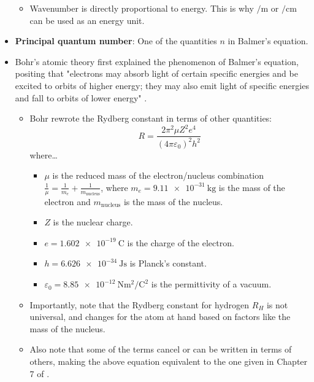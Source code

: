 \documentclass[../notes.tex]{subfiles}
\begin{document}
\begin{itemize}
    \begin{itemize}
        \item Wavenumber is directly proportional to energy. This is why $\si{\per\meter}$ or $\si{\per\centi\meter}$ can be used as an energy unit.
    \end{itemize}
    \item \textbf{Principal quantum number}: One of the quantities $n$ in Balmer's equation.
    \item Bohr's atomic theory first explained the phenomenon of Balmer's equation, positing that "electrons may absorb light of certain specific energies and be excited to orbits of higher energy; they may also emit light of specific energies and fall to orbits of lower energy" \parencite[11-12]{bib:MiesslerFischerTarr}.
    \begin{itemize}
        \item Bohr rewrote the Rydberg constant in terms of other quantities:
        \begin{equation*}
            R = \frac{2\pi^2\mu Z^2e^4}{(4\pi\varepsilon_0)^2h^2}
        \end{equation*}
        where\dots
        \begin{itemize}
            \item $\mu$ is the reduced mass of the electron/nucleus combination $\frac{1}{\mu}=\frac{1}{m_e}+\frac{1}{m_\text{nucleus}}$, where $m_e=\SI{9.11e-31}{\kilo\gram}$ is the mass of the electron and $m_\text{nucleus}$ is the mass of the nucleus.
            \item $Z$ is the nuclear charge.
            \item $e=\SI{1.602e-19}{\coulomb}$ is the charge of the electron.
            \item $h=\SI{6.626e-34}{\joule\second}$ is Planck's constant.
            \item $\varepsilon_0=\SI{8.85e-12}{\newton\meter\squared\per\coulomb\squared}$ is the permittivity of a vacuum.
        \end{itemize}
        \item Importantly, note that the Rydberg constant for hydrogen $R_H$ is not universal, and changes for the atom at hand based on factors like the mass of the nucleus.
        \item Also note that some of the terms cancel or can be written in terms of others, making the above equation equivalent to the one given in Chapter 7 of \textcite{bib:APChemNotes}.
    \end{itemize}
    \begin{figure}[h!]
        \centering
\end{figure}
\end{itemize}
\end{document}
